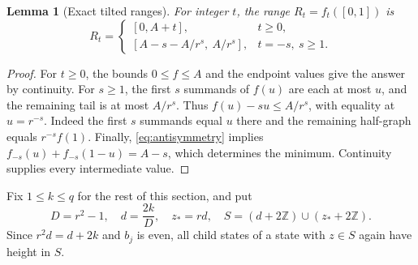 \documentclass[11pt]{article}
\newtheorem{lemma}[theorem]{Lemma}
\theoremstyle{definition}
\theoremstyle{remark}
\newcommand{\Z}{\mathbb Z}
\begin{document}
\begin{lemma}[Exact tilted ranges]\label{lem:ranges}
For integer $t$, the range $R_t=f_t([0,1])$ is
\begin{equation}\label{eq:ranges}
 R_t=\begin{cases}
 [0,A+t],&t\ge0,\\
 [A-s-A/r^s,\ A/r^s],&t=-s,\ s\ge1.
 \end{cases}
\end{equation}
\end{lemma}
\begin{proof}
For $t\ge0$, the bounds $0\le f\le A$ and the endpoint values give the
answer by continuity. For $s\ge1$, the first $s$ summands of $f(u)$ are
each at most $u$, and the remaining tail is at most $A/r^s$. Thus
$f(u)-su\le A/r^s$, with equality at $u=r^{-s}$. Indeed the first $s$
summands equal $u$ there and the remaining half-graph equals $r^{-s}f(1)$.
Finally, \cref{eq:antisymmetry} implies
$f_{-s}(u)+f_{-s}(1-u)=A-s$, which determines the minimum.
Continuity supplies every intermediate value.
\end{proof}

Fix $1\le k\le q$ for the rest of this section, and put
\begin{equation}\label{eq:residues}
 D=r^2-1,\quad d=\frac{2k}{D},\quad z_*=rd,\quad
 S=(d+2\Z)\cup(z_*+2\Z).
\end{equation}
Since $r^2d=d+2k$ and $b_j$ is even, all child states of a state with
$z\in S$ again have height in $S$.
\end{document}
